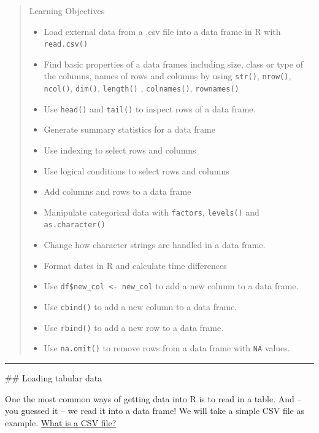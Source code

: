 \documentclass[
]{book}
\providecommand{\tightlist}{%
  \setlength{\itemsep}{0pt}\setlength{\parskip}{0pt}}
\begin{document}
\begin{quote}
Learning Objectives

\begin{itemize}
\tightlist
\item
  Load external data from a .csv file into a data frame in R with \texttt{read.csv()}
\item
  Find basic properties of a data frames including size, class or type of the columns, names of rows and columns by using \texttt{str()}, \texttt{nrow()}, \texttt{ncol()}, \texttt{dim()}, \texttt{length()} , \texttt{colnames()}, \texttt{rownames()}
\item
  Use \texttt{head()} and \texttt{tail()} to inspect rows of a data frame.
\item
  Generate summary statistics for a data frame
\item
  Use indexing to select rows and columns
\item
  Use logical conditions to select rows and columns
\item
  Add columns and rows to a data frame
\item
  Manipulate categorical data with \texttt{factors}, \texttt{levels()} and \texttt{as.character()}
\item
  Change how character strings are handled in a data frame.
\item
  Format dates in R and calculate time differences
\item
  Use \texttt{df\$new\_col\ \textless{}-\ new\_col} to add a new column to a data frame.
\item
  Use \texttt{cbind()} to add a new column to a data frame.
\item
  Use \texttt{rbind()} to add a new row to a data frame.
\item
  Use \texttt{na.omit()} to remove rows from a data frame with \texttt{NA} values.
\end{itemize}
\end{quote}

\begin{center}\rule{0.5\linewidth}{0.5pt}\end{center}

\#\# Loading tabular data

One the most common ways of getting data into R is to read in a table. And -- you guessed it -- we read it into a data frame! We will take a simple CSV file as example. \href{https://support.bigcommerce.com/articles/Public/What-is-a-CSV-file-and-how-do-I-save-my-spreadsheet-as-one}{What is a CSV file?}
\end{document}
